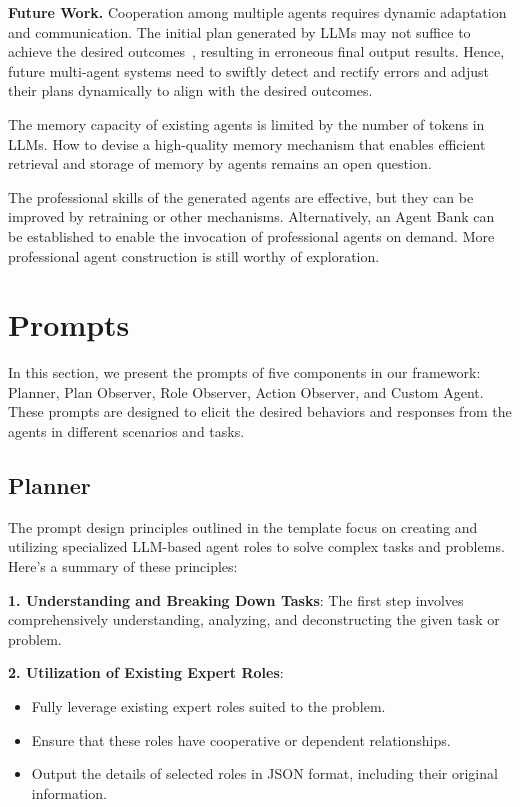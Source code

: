 \vspace{1mm}
\noindent\textbf{Future Work.}
Cooperation among multiple agents requires dynamic adaptation and communication. The initial plan generated by LLMs may not suffice to achieve the desired outcomes~\cite{chen2024adaptive}, resulting in erroneous final output results. Hence, future multi-agent systems need to swiftly detect and rectify errors and adjust their plans dynamically to align with the desired outcomes.

The memory capacity of existing agents is limited by the number of tokens in LLMs. How to devise a high-quality memory mechanism that enables efficient retrieval and storage of memory by agents remains an open question.

The professional skills of the generated agents are effective, but they can be improved by retraining or other mechanisms. Alternatively, an Agent Bank can be established to enable the invocation of professional agents on demand. More professional agent construction is still worthy of exploration.

\section{Prompts}
In this section, we present the prompts of five components in our framework: Planner, Plan Observer, Role Observer, Action Observer, and Custom Agent. These prompts are designed to elicit the desired behaviors and responses from the agents in different scenarios and tasks.

\subsection{Planner}

The prompt design principles outlined in the template focus on creating and utilizing specialized LLM-based agent roles to solve complex tasks and problems. Here's a summary of these principles:

\textbf{1. Understanding and Breaking Down Tasks}: The first step involves comprehensively understanding, analyzing, and deconstructing the given task or problem.

\textbf{2. Utilization of Existing Expert Roles}:
\begin{itemize}
\item Fully leverage existing expert roles suited to the problem.
\item Ensure that these roles have cooperative or dependent relationships.
\item Output the details of selected roles in JSON format, including their original information.
\end{itemize}

